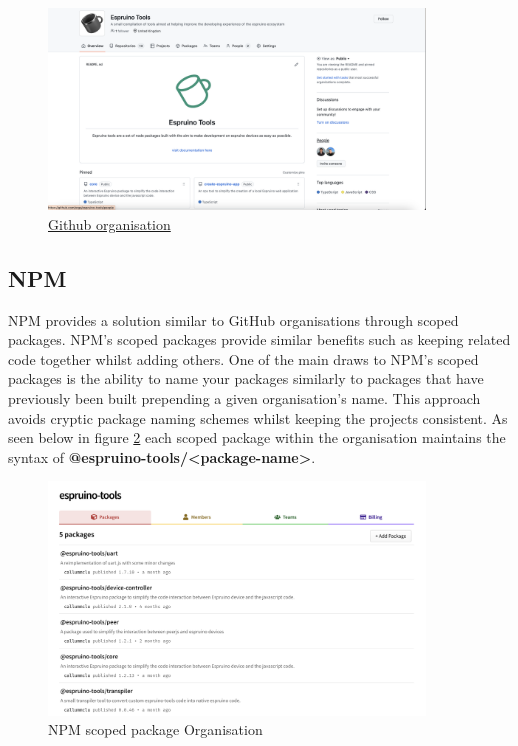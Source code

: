 \documentclass{l4proj}
\begin{document}
\begin{figure}[!ht]
    \centering
    \includegraphics[width=10cm]{dissertation/images/github-organisation.png}
    \caption{\href{https://github.com/espruino-tools}{Github organisation}}
    \label{fig:ghorg}
\end{figure}

\subsection{NPM}

NPM provides a solution similar to GitHub organisations through scoped packages. NPM's scoped packages provide similar benefits such as keeping related code together whilst adding others. One of the main draws to NPM's scoped packages is the ability to name your packages similarly to packages that have previously been built prepending a given organisation's name. This approach avoids cryptic package naming schemes whilst keeping the projects consistent. As seen below in figure \ref{fig:npmorg} each scoped package within the organisation maintains the syntax of \textbf{@espruino-tools/<package-name>}.

\begin{figure}[!ht]
    \centering
    \includegraphics[width=10cm]{dissertation/images/npm-scoped-packages.png}
    \caption{NPM scoped package Organisation}
    \label{fig:npmorg}
\end{figure}
\end{document}
